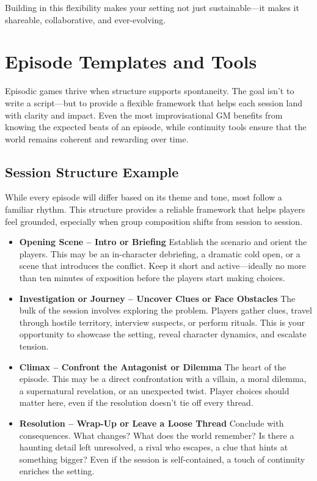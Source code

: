 Building in this flexibility makes your setting not just sustainable—it makes it shareable, collaborative, and ever-evolving.



\section{Episode Templates and Tools}

Episodic games thrive when structure supports spontaneity. The goal isn’t to write a script—but to provide a flexible framework that helps each session land with clarity and impact. Even the most improvisational GM benefits from knowing the expected beats of an episode, while continuity tools ensure that the world remains coherent and rewarding over time.

\subsection*{Session Structure Example}

While every episode will differ based on its theme and tone, most follow a familiar rhythm. This structure provides a reliable framework that helps players feel grounded, especially when group composition shifts from session to session.

\begin{itemize}
    \item \textbf{Opening Scene – Intro or Briefing}  
    Establish the scenario and orient the players. This may be an in-character debriefing, a dramatic cold open, or a scene that introduces the conflict. Keep it short and active—ideally no more than ten minutes of exposition before the players start making choices.

    \item \textbf{Investigation or Journey – Uncover Clues or Face Obstacles}  
    The bulk of the session involves exploring the problem. Players gather clues, travel through hostile territory, interview suspects, or perform rituals. This is your opportunity to showcase the setting, reveal character dynamics, and escalate tension.

    \item \textbf{Climax – Confront the Antagonist or Dilemma}  
    The heart of the episode. This may be a direct confrontation with a villain, a moral dilemma, a supernatural revelation, or an unexpected twist. Player choices should matter here, even if the resolution doesn’t tie off every thread.

    \item \textbf{Resolution – Wrap-Up or Leave a Loose Thread}  
    Conclude with consequences. What changes? What does the world remember? Is there a haunting detail left unresolved, a rival who escapes, a clue that hints at something bigger? Even if the session is self-contained, a touch of continuity enriches the setting.
\end{itemize}

